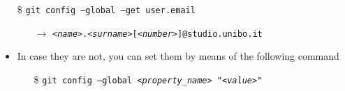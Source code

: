 \documentclass[handout]{beamer}\mode<presentation>{\usetheme{AMSCesenaPurpleAndGold}}
\begin{document}
\begin{frame}[allowframebreaks]
\begin{enumerate}
\begin{itemize}
    	\item[\$] \texttt{git config --global --get user.\alert{email}}
    	\begin{itemize}	
    		\item[$\rightarrow$] \texttt{\textit{<name>}.\textit{<surname>}[\textit{<number>}]@\alert{studio.unibo.it}}    		
    	\end{itemize}
    
    	\vspace{.5cm}
    	
    	\item In case they are not, you can set them by means of the following command
    	\begin{itemize}	
    		\item[\$] \texttt{git config --global \texttt{\textit{<property\_name>}} \alert{"}\texttt{\textit{<value>}}\alert{"}}		
    	\end{itemize}
    \end{itemize}
    
    
			
	
	
		
		
    

\end{enumerate}
\end{frame}
\end{document}
